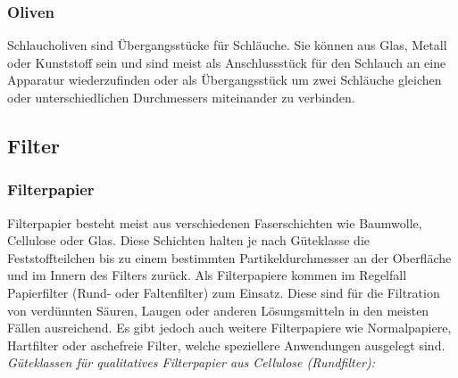 \vspace{5mm}


\subsubsection{Oliven}
Schlaucholiven sind Übergangsstücke für Schläuche. Sie können aus Glas, Metall oder Kunststoff sein und sind meist als Anschlussstück für den Schlauch an eine Apparatur wiederzufinden oder als Übergangsstück um zwei Schläuche gleichen oder unterschiedlichen Durchmessers miteinander zu verbinden.


\newpage

\subsection{Filter}
\subsubsection{Filterpapier}
Filterpapier besteht meist aus verschiedenen Faserschichten wie Baumwolle, Cellulose oder Glas. Diese Schichten halten je nach Güteklasse die Feststoffteilchen bis zu einem bestimmten Partikeldurchmesser an der Oberfläche und im Innern des Filters zurück. Als Filterpapiere kommen im Regelfall Papierfilter (Rund- oder Faltenfilter) zum Einsatz. Diese sind für die Filtration von verdünnten Säuren, Laugen oder anderen Lösungsmitteln in den meisten Fällen ausreichend. Es gibt jedoch auch weitere Filterpapiere wie Normalpapiere, Hartfilter oder aschefreie Filter, welche speziellere Anwendungen ausgelegt sind.\\

\textit{Güteklassen für qualitatives Filterpapier aus Cellulose (Rundfilter):}

